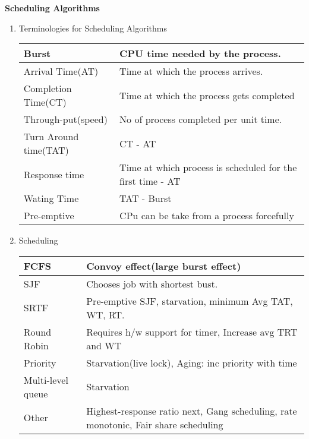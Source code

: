 
\centerline{\textbf{ \LARGE Scheduling Algorithms}}




\begin{enumerate}

  \item Terminologies for Scheduling Algorithms

  \begin{myTableStyle}
    \begin{tabular}{ |l|l| } \hline
        Burst                 &     CPU time needed by the process.                             \\ \hline
        Arrival Time(AT)      &     Time at which the process arrives.                          \\ \hline
        Completion Time(CT)   &     Time at which the process gets completed                    \\ \hline
        Through-put(speed)    &     No of process completed per unit time.                      \\ \hline
        Turn Around time(TAT) &     CT - AT                                                     \\ \hline
        Response time         &     Time at which process is scheduled for the first time - AT  \\ \hline
        Wating Time           &     TAT -  Burst                                                \\ \hline
        Pre-emptive           &     CPu can be take from a process forcefully                   \\ \hline
    \end{tabular}
  \end{myTableStyle}

  \item Scheduling

  \begin{myTableStyle}
    \begin{tabular}{ |l|l| } \hline
        FCFS                &     Convoy effect(large burst effect)                             \\ \hline
        SJF                 &     Chooses job with shortest bust.                               \\ \hline
        SRTF                &     Pre-emptive SJF, starvation, minimum Avg TAT, WT, RT.         \\ \hline
        Round Robin         &     Requires h/w support for timer, Increase avg TRT and WT       \\ \hline
        Priority            &     Starvation(live lock), Aging: inc priority with time         \\ \hline
        Multi-level queue   &     Starvation                                                    \\ \hline
        Other               &     Highest-response ratio next, Gang scheduling, rate monotonic, Fair share scheduling \\ \hline
    \end{tabular}
  \end{myTableStyle}


\end{enumerate}
